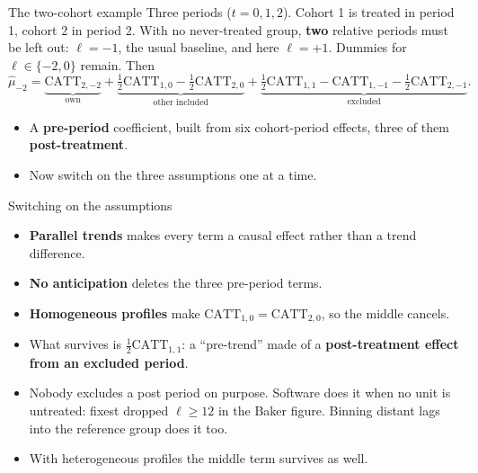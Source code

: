 \documentclass[
  11pt,
  ignorenonframetext,
  aspectratio=169,
]{beamer}
\providecommand{\tightlist}{%
  \setlength{\itemsep}{0pt}\setlength{\parskip}{0pt}}
\begin{document}
\begin{frame}{The two-cohort example}
\protect{}\label{the-two-cohort-example}
Three periods (\(t = 0, 1, 2\)). Cohort 1 is treated in period 1, cohort
2 in period 2. With no never-treated group, \textbf{two} relative
periods must be left out: \(\ell = -1\), the usual baseline, and here
\(\ell = +1\). Dummies for \(\ell \in \{-2, 0\}\) remain. Then \[
\hat\mu_{-2} = \underbrace{\text{CATT}_{2,-2}}_{\text{own}} + \underbrace{\tfrac12\text{CATT}_{1,0} - \tfrac12\text{CATT}_{2,0}}_{\text{other included}} + \underbrace{\tfrac12\text{CATT}_{1,1} - \text{CATT}_{1,-1} - \tfrac12\text{CATT}_{2,-1}}_{\text{excluded}}.
\]

\begin{itemize}
\tightlist
\item
  A \textbf{pre-period} coefficient, built from six cohort-period
  effects, three of them \textbf{post-treatment}.
\item
  Now switch on the three assumptions one at a time.
\end{itemize}
\end{frame}

\begin{frame}{Switching on the assumptions}
\protect{}\label{switching-on-the-assumptions}
\begin{itemize}
\tightlist
\item
  \textbf{Parallel trends} makes every term a causal effect rather than
  a trend difference.
\item
  \textbf{No anticipation} deletes the three pre-period terms.
\item
  \textbf{Homogeneous profiles} make
  \(\text{CATT}_{1,0} = \text{CATT}_{2,0}\), so the middle cancels.
\end{itemize}

\vspace{0.4em}

\begin{itemize}
\tightlist
\item
  What survives is \(\tfrac12\text{CATT}_{1,1}\): a ``pre-trend'' made
  of a \textbf{post-treatment effect from an excluded period}.
\item
  Nobody excludes a post period on purpose. Software does it when no
  unit is untreated: fixest dropped \(\ell \ge 12\) in the Baker figure.
  Binning distant lags into the reference group does it too.
\item
  With heterogeneous profiles the middle term survives as well.
\end{itemize}
\end{frame}
\end{document}
